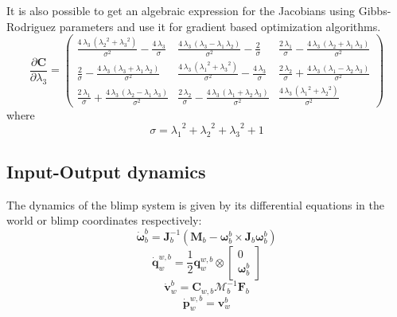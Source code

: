 It is also possible to get an algebraic expression for the Jacobians using Gibbs-Rodriguez parameters and use it for gradient based optimization algorithms.
\begin{equation}
\frac{\partial \mathbf{C}}{\partial \lambda_3} = \left(\begin{array}{ccc} \frac{4\, {\lambda_3}\, \left({{\lambda_2}}^2 + {{\lambda_3}}^2\right)}{{\sigma}^2} - \frac{4\, {\lambda_3}}{\sigma} & \frac{4\, {\lambda_3}\, \left({\lambda_3} - {\lambda_1}\, {\lambda_2}\right)}{{\sigma}^2} - \frac{2}{\sigma} & \frac{2\, {\lambda_1}}{\sigma} - \frac{4\, {\lambda_3}\, \left({\lambda_2} + {\lambda_1}\, {\lambda_3}\right)}{{\sigma}^2}\\ \frac{2}{\sigma} - \frac{4\, {\lambda_3}\, \left({\lambda_3} + {\lambda_1}\, {\lambda_2}\right)}{{\sigma}^2} & \frac{4\, {\lambda_3}\, \left({{\lambda_1}}^2 + {{\lambda_3}}^2\right)}{{\sigma}^2} - \frac{4\, {\lambda_3}}{\sigma} & \frac{2\, {\lambda_2}}{\sigma} + \frac{4\, {\lambda_3}\, \left({\lambda_1} - {\lambda_2}\, {\lambda_3}\right)}{{\sigma}^2}\\ \frac{2\, {\lambda_1}}{\sigma} + \frac{4\, {\lambda_3}\, \left({\lambda_2} - {\lambda_1}\, {\lambda_3}\right)}{{\sigma}^2} & \frac{2\, {\lambda_2}}{\sigma} - \frac{4\, {\lambda_3}\, \left({\lambda_1} + {\lambda_2}\, {\lambda_3}\right)}{{\sigma}^2} & \frac{4\, {\lambda_3}\, \left({{\lambda_1}}^2 + {{\lambda_2}}^2\right)}{{\sigma}^2} \end{array}\right)
\end{equation}
where
\begin{equation}
\sigma = {\lambda_1}^2 + {\lambda_2}^2 + {\lambda_3}^2 + 1
\end{equation}
\subsection{Input-Output dynamics}
The dynamics of the blimp system is given by its differential equations in the world or blimp coordinates respectively:
\begin{equation}
\label{eqn_dyn_angular_velocity}
\dot{\boldsymbol{\omega}}_b^b = \mathbf{J}_b^{-1} \left( \mathbf{M}_b  - \boldsymbol{\omega}_b^b \times \mathbf{J}_b \boldsymbol{\omega}_b^b \right)
\end{equation}
\begin{equation}
\label{eqn_dyn_orientation}
\dot{\mathbf{q}}_w^{w,b} = \frac{1}{2} \mathbf{q}_w^{w,b} \otimes \left[
\begin{array}{c}
	0 \\ \boldsymbol{\omega}_b^b
\end{array} \right]
\end{equation}
\begin{equation}
\label{eqn_dyn_velocity}
\dot{\mathbf{v}}_w^b = \mathbf{C}_{w,b}\mathbf{\mathcal{M}}_b^{-1} \mathbf{F}_b
\end{equation}
\begin{equation}
\label{eqn_dyn_position}
\dot{\mathbf{p}}_w^{w,b} = \mathbf{v}_w^b
\end{equation}

